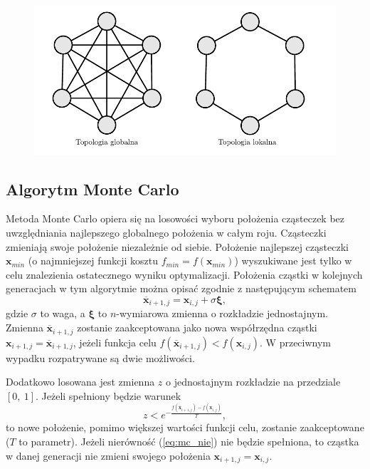 \documentclass[11pt, a4paper, oneside]{article}
\newcommand{\vect}[1]{\bm{\mathbf{#1}}}
\begin{document}
\begin{figure}[h]
\centerline{\includegraphics[width=\dimexpr.9\textwidth-1em]{grafiki/topologie.pdf}}
\label{fig:topologia}
\end{figure}

\subsection{Algorytm Monte Carlo} 

Metoda Monte Carlo opiera się na losowości wyboru położenia cząsteczek bez uwzględniania najlepszego globalnego położenia w całym roju. Cząsteczki zmieniają swoje położenie niezależnie od siebie. Położenie najlepszej cząsteczki $\vect{x}_{min}$ (o najmniejszej funkcji kosztu $f_{min} = f\left(\vect{x}_{min}\right)$) wyszukiwane jest tylko w celu znalezienia ostatecznego wyniku optymalizacji. Położenia cząstki w kolejnych generacjach w tym algorytmie można opisać zgodnie z następującym schematem
\begin{equation}
\vect{\overline{x}}_{i + 1, j} = \vect{x}_{i, j} + \sigma\vect{\xi},
\end{equation}
gdzie $\sigma$ to waga, a $\vect{\xi}$ to $n$-wymiarowa zmienna o rozkładzie jednostajnym. Zmienna $\vect{\overline{x}}_{i + 1, j}$ zostanie zaakceptowana jako nowa współrzędna cząstki $\vect{x}_{i + 1, j} = \vect{\overline{x}}_{i + 1, j}$, jeżeli funkcja celu $f\left(\vect{\overline{x}}_{i + 1, j}\right) < f\left(\vect{x}_{i, j}\right)$. W przeciwnym wypadku rozpatrywane są dwie możliwości.

Dodatkowo losowana jest zmienna $z$ o jednostajnym rozkładzie na przedziale $\left[0, \ 1 \right]$. Jeżeli spełniony będzie warunek
\begin{equation} \label{eq:mc_nie}
z < e^{-\frac{f\left(\vect{\overline{x}}_{i + 1, j}\right) - f\left(\vect{x}_{i, j}\right)}{T}},
\end{equation}
to nowe położenie, pomimo większej wartości funkcji celu, zostanie zaakceptowane ($T$ to parametr). Jeżeli nierówność (\ref{eq:mc_nie}) nie będzie spełniona, to cząstka w danej generacji nie zmieni swojego położenia $\vect{x}_{i + 1, j} = \vect{x}_{i, j}$. 
\end{document}

